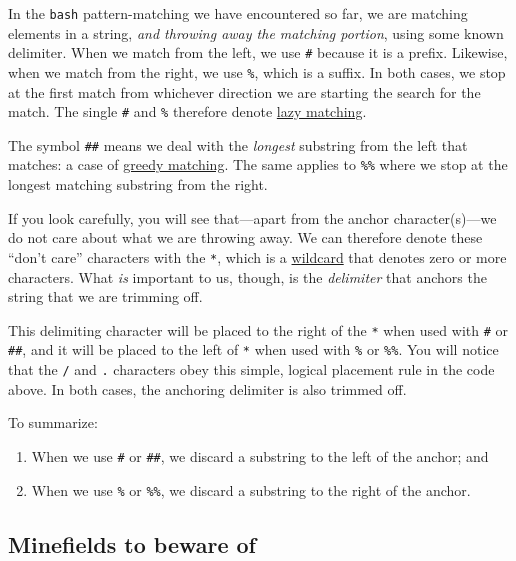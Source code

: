\documentclass[
  a4paper,
]{article}
\providecommand{\tightlist}{%
  \setlength{\itemsep}{0pt}\setlength{\parskip}{0pt}}
\begin{document}
In the \texttt{bash} pattern-matching we have encountered so far, we are
matching elements in a string, \emph{and throwing away the matching
portion}, using some known delimiter. When we match from the left, we
use \texttt{\#} because it is a prefix. Likewise, when we match from the
right, we use \texttt{\%}, which is a suffix. In both cases, we stop at
the first match from whichever direction we are starting the search for
the match. The single \texttt{\#} and \texttt{\%} therefore denote
\href{https://stackoverflow.com/questions/2301285/what-do-lazy-and-greedy-mean-in-the-context-of-regular-expressions}{lazy
matching}.

The symbol \texttt{\#\#} means we deal with the \emph{longest} substring
from the left that matches: a case of
\href{https://www.geeksforgeeks.org/perl-greedy-and-non-greedy-match/}{greedy
matching}. The same applies to \texttt{\%\%} where we stop at the
longest matching substring from the right.

If you look carefully, you will see that---apart from the anchor
character(s)---we do not care about what we are throwing away. We can
therefore denote these ``don't care'' characters with the \texttt{*},
which is a
\href{https://en.wikipedia.org/wiki/Wildcard_character}{wildcard} that
denotes zero or more characters. What \emph{is} important to us, though,
is the \emph{delimiter} that anchors the string that we are trimming
off.

This delimiting character will be placed to the right of the \texttt{*}
when used with \texttt{\#} or \texttt{\#\#}, and it will be placed to
the left of \texttt{*} when used with \texttt{\%} or \texttt{\%\%}. You
will notice that the \texttt{/} and \texttt{.} characters obey this
simple, logical placement rule in the code above. In both cases, the
anchoring delimiter is also trimmed off.

To summarize:

\begin{enumerate}
\tightlist
\item
  When we use \texttt{\#} or \texttt{\#\#}, we discard a substring to
  the left of the anchor; and
\item
  When we use \texttt{\%} or \texttt{\%\%}, we discard a substring to
  the right of the anchor.
\end{enumerate}

\hypertarget{minefields-to-beware-of}{%
\subsection{Minefields to beware of}\label{minefields-to-beware-of}}
\end{document}
